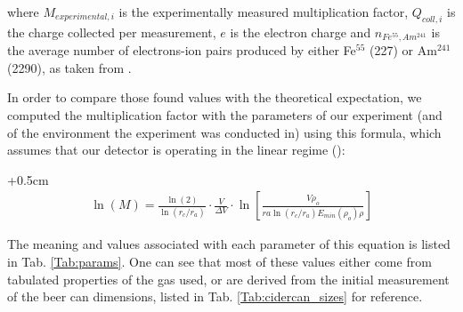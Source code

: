 where $M_{experimental,i}$ is the experimentally measured multiplication factor, $Q_{coll,i}$ is the charge collected per measurement, $e$ is the electron charge and $n_{Fe^{55},Am^{241}}$ is the average number of electrons-ion pairs produced by either Fe$^{55}$ (227) or Am$^{241}$ (2290), as taken from \cite{can_paper}.

In order to compare those found values with the theoretical expectation, we computed the multiplication factor with the parameters of our experiment (and of the environment the experiment was conducted in) using this formula, which assumes that our detector is operating in the linear regime (\cite{gas_detect}):

\begin{adjustwidth}{+0.5cm}{}
\begin{align}
\ln(M)=\frac{\ln(2)}{\ln(r_{c}/r_{a})}\cdot\frac{V}{\Delta V}\cdot\ln\left[ \frac{V\rho_{o}}{ra\ln(r_{c}/r_{a})E_{min}(\rho_{o})\rho}\right]
\label{eq:lnm}
\end{align}
\end{adjustwidth}

The meaning and values associated with each parameter of this equation is listed in Tab. \ref{Tab:params}. One can see that most of these values either come from tabulated properties of the gas used, or are derived from the initial measurement of the beer can dimensions, listed in Tab. \ref{Tab:cidercan_sizes} for reference.


